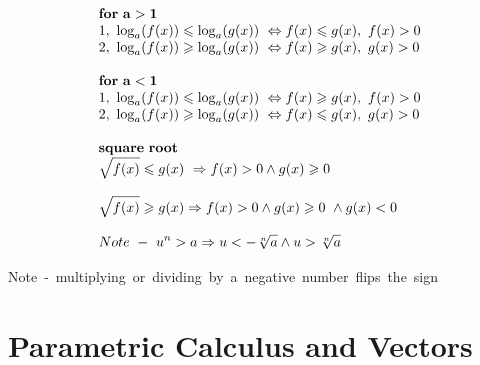 \documentclass{article}
\begin{document}
\[\begin{array}{>{\displaystyle}l}
    \mathbf{for\ a >1}\\
    1,\ \log_{a}( f( x)) \leqslant \log_{a}( g( x)) \ \Leftrightarrow f( x) \leqslant g( x) ,\ f( x)  >0\\
    2,\ \log_{a}( f( x)) \geqslant \log_{a}( g( x)) \ \Leftrightarrow f( x) \geqslant g( x) ,\ g( x)  >0\\
    \\
    \mathbf{for\ a< 1}\\
    1,\ \log_{a}( f( x)) \leqslant \log_{a}( g( x)) \ \Leftrightarrow f( x) \geqslant g( x) ,\ f( x)  >0\\
    2,\ \log_{a}( f( x)) \geqslant \log_{a}( g( x)) \ \Leftrightarrow f( x) \leqslant g( x) ,\ g( x)  >0\\
    \\
    \mathbf{square\ root}\\
    \sqrt{f( x)} \leqslant g( x) \ \Rightarrow f( x)  >0\land g( x) \geqslant 0\\
    \\
    \sqrt{f( x)} \geqslant g( x) \Rightarrow f( x)  >0\land g( x) \geqslant 0\ \land g( x) < 0\\
    \\
    Note\ -\ u^{n}  >a\Rightarrow u< -\sqrt[n]{a} \land u >\sqrt[n]{a}
\end{array} 
\]
   
Note\ -\ multiplying\ or\ dividing\ by\ a\ negative\ number\ flips\ the\ sign

\newpage

\section{Parametric Calculus and Vectors}
\end{document}
